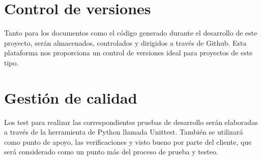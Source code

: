 \section{Control de versiones}

Tanto para los documentos como el código generado durante el desarrollo de este proyecto, serán almacenados, controlados y dirigidos a través de Github. Esta plataforma nos proporciona un control de versiones ideal para proyectos de este tipo.

\section{Gestión de calidad}

Los test para realizar las correspondientes pruebas de desarrollo serán elaboradas a través de la herramienta de Python llamada Unittest. También se utilizará como punto de apoyo, las verificaciones y visto bueno por parte del cliente, que será considerado como un punto más del proceso de prueba y testeo.

%
%

       
